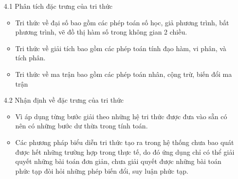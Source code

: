 \documentclass[a4paper]{article}
\begin{document}
\begin{enumerate}
	
\item [4.1] Phân tích đặc trưng của tri thức
\begin{itemize}
\item Tri thức về đại số bao gồm các phép toán số học, giả phương trình, bất phương trình, vẽ đồ thị hàm số trong không gian 2 chiều.
\item Tri thức về giải tích bao gồm các phép toán tính đạo hàm, vi phân, và tích phân.
\item Tri thức về ma trận bao gồm các phép toán nhân, cộng trừ, biến đổi ma trận
\end{itemize}

\item [4.2]Nhận định về đặc trưng của tri thức
\begin{itemize}
\item Vì áp dụng từng bước giải theo những hệ tri thức được đưa vào sẵn có nên có những bước dư thừa trong tính toán.
\item Các phương pháp biểu diễn tri thức tạo ra trong hệ thống chưa bao quát được hết những trường hợp trong thực tế, do đó ứng dụng chỉ có thể giải quyết những bài toán đơn giản, chưa giải quyết được những bài toán phức tạp đòi hỏi những phép biến đổi, suy luận phức tạp.
\end{itemize}

\end{enumerate}	
\end{document}
